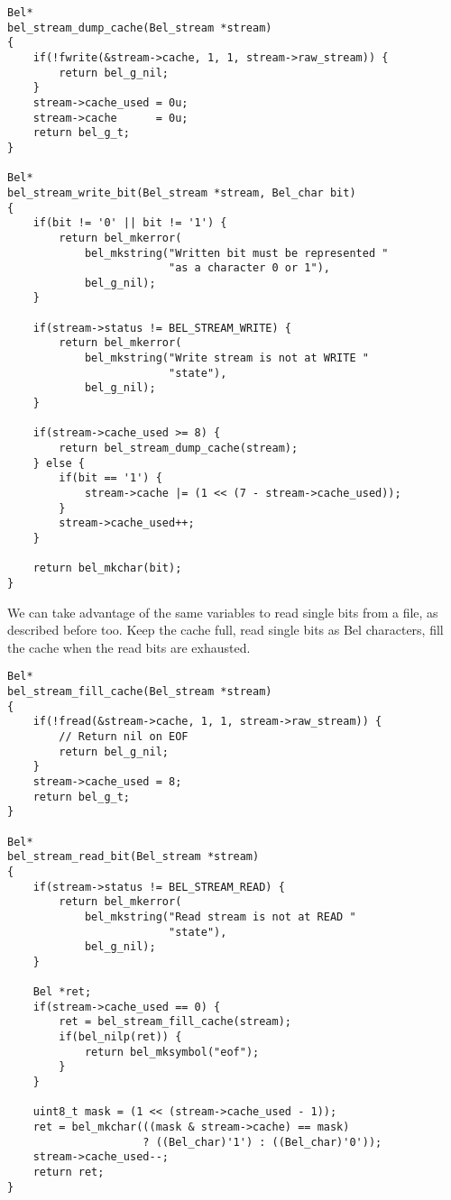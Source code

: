 \documentclass[openright,a4paper,twoside,12pt]{memoir}
\begin{document}
\begin{verbatim}
Bel*
bel_stream_dump_cache(Bel_stream *stream)
{
    if(!fwrite(&stream->cache, 1, 1, stream->raw_stream)) {
        return bel_g_nil;
    }
    stream->cache_used = 0u;
    stream->cache      = 0u;
    return bel_g_t;
}

Bel*
bel_stream_write_bit(Bel_stream *stream, Bel_char bit)
{
    if(bit != '0' || bit != '1') {
        return bel_mkerror(
            bel_mkstring("Written bit must be represented "
                         "as a character 0 or 1"),
            bel_g_nil);
    }

    if(stream->status != BEL_STREAM_WRITE) {
        return bel_mkerror(
            bel_mkstring("Write stream is not at WRITE "
                         "state"),
            bel_g_nil);
    }

    if(stream->cache_used >= 8) {
        return bel_stream_dump_cache(stream);
    } else {
        if(bit == '1') {
            stream->cache |= (1 << (7 - stream->cache_used));
        }
        stream->cache_used++;
    }
    
    return bel_mkchar(bit);
}
\end{verbatim}

We can take advantage of the same variables to read single bits from a
file, as described before too. Keep the cache full, read single bits
as Bel characters, fill the cache when the read bits are exhausted.

\begin{verbatim}
Bel*
bel_stream_fill_cache(Bel_stream *stream)
{
    if(!fread(&stream->cache, 1, 1, stream->raw_stream)) {
        // Return nil on EOF
        return bel_g_nil;
    }
    stream->cache_used = 8;
    return bel_g_t;
}

Bel*
bel_stream_read_bit(Bel_stream *stream)
{
    if(stream->status != BEL_STREAM_READ) {
        return bel_mkerror(
            bel_mkstring("Read stream is not at READ "
                         "state"),
            bel_g_nil);
    }
    
    Bel *ret;
    if(stream->cache_used == 0) {
        ret = bel_stream_fill_cache(stream);
        if(bel_nilp(ret)) {
            return bel_mksymbol("eof");
        }
    }

    uint8_t mask = (1 << (stream->cache_used - 1));
    ret = bel_mkchar(((mask & stream->cache) == mask)
                     ? ((Bel_char)'1') : ((Bel_char)'0'));
    stream->cache_used--;
    return ret;
}
\end{verbatim}
\end{document}
